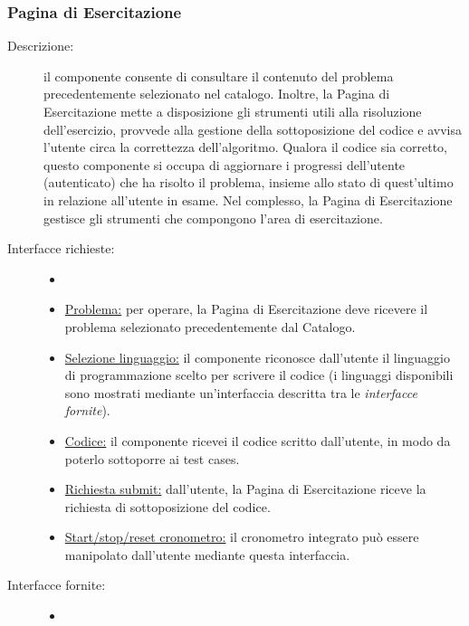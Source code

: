 \documentclass[11pt, a4paper]{article}
\theoremstyle{definition} %
\begin{document}
\subsubsection{Pagina di Esercitazione}
\begin{description}
    \item[Descrizione:] il componente consente di consultare il contenuto del problema
    precedentemente selezionato nel catalogo. Inoltre, la Pagina di Esercitazione mette
    a disposizione gli strumenti utili alla risoluzione dell'esercizio, provvede alla
    gestione della sottoposizione del codice e avvisa l'utente circa la correttezza dell'algoritmo.
    Qualora il codice sia corretto, questo componente si occupa di aggiornare i progressi
    dell'utente (autenticato) che ha risolto il problema, insieme allo stato di quest'ultimo
    in relazione all'utente in esame. Nel complesso, la Pagina di Esercitazione
    gestisce gli strumenti che compongono l'area di esercitazione.

    \item[Interfacce richieste:]
    \begin{itemize}
        \item[]

        \item \underline{Problema:} per operare, la Pagina di Esercitazione
        deve ricevere il problema selezionato precedentemente dal Catalogo.

        \item \underline{Selezione linguaggio:} il componente riconosce dall'utente il
        linguaggio di programmazione scelto per scrivere il codice (i linguaggi disponibili
        sono mostrati mediante un'interfaccia descritta tra le \textit{interfacce fornite}).

        \item \underline{Codice:} il componente ricevei il codice scritto
        dall'utente, in modo da poterlo sottoporre ai test cases.

        \item \underline{Richiesta submit:} dall'utente, la Pagina di Esercitazione
        riceve la richiesta di sottoposizione del codice.

        \item \underline{Start/stop/reset cronometro:} il cronometro integrato
        può essere manipolato dall'utente mediante questa interfaccia.
    \end{itemize}

    \item[Interfacce fornite:]
    \begin{itemize}
        \item[]


\end{itemize}
\end{description}
\end{document}
